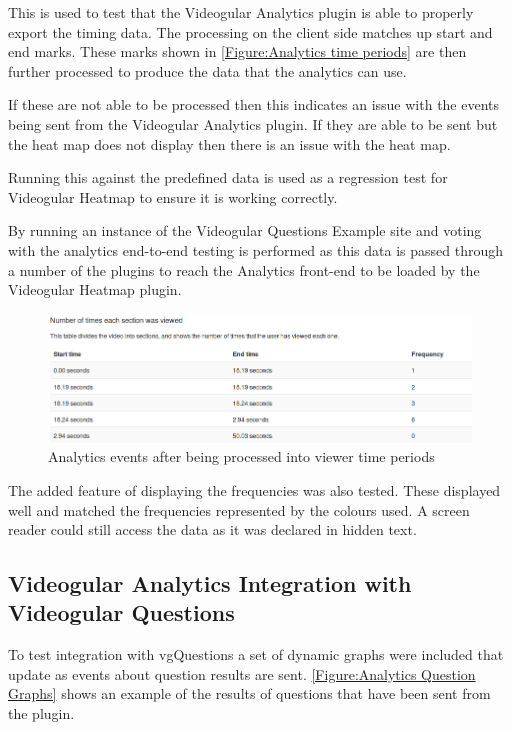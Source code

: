 This is used to test that the \gls{Videogular} Analytics plugin is able to properly export the timing data. The processing on the client side matches up start and end marks. These marks shown in \autoref{Figure:Analytics time periods} are then further processed to produce the data that the analytics can use.

If these are not able to be processed then this indicates an issue with the events being sent from the \gls{Videogular} Analytics plugin. If they are able to be sent but the heat map does not display then there is an issue with the heat map.

Running this against the predefined data is used as a regression test for \gls{Videogular} Heatmap to ensure it is working correctly.

By running an instance of the Videogular Questions Example site and voting with the analytics end-to-end testing is performed as this data is passed through a number of the plugins to reach the Analytics front-end to be loaded by the \gls{Videogular} Heatmap plugin.

\begin{figure}[h]
	\centering
		\includegraphics[scale=0.4]{../figures/analytics_time_periods.png}
	\caption{\label{Figure:Analytics time periods} Analytics events after being processed into viewer time periods}
\end{figure}

The added feature of displaying the frequencies was also tested. These displayed well and matched the frequencies represented by the colours used. A screen reader could still access the data as it was declared in hidden text.

\subsection{Videogular Analytics Integration with Videogular Questions}

To test integration with \gls{vgQuestions} a set of dynamic graphs were included that update as events about question results are sent. \autoref{Figure:Analytics Question Graphs} shows an example of the results of questions that have been sent from the plugin.

